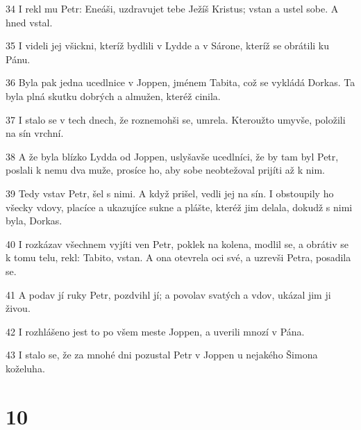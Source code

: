 \par 34 I rekl mu Petr: Eneáši, uzdravujet tebe Ježíš Kristus; vstan a ustel sobe. A hned vstal.
\par 35 I videli jej všickni, kteríž bydlili v Lydde a v Sárone, kteríž se obrátili ku Pánu.
\par 36 Byla pak jedna ucedlnice v Joppen, jménem Tabita, což se vykládá Dorkas. Ta byla plná skutku dobrých a almužen, kteréž cinila.
\par 37 I stalo se v tech dnech, že roznemohši se, umrela. Kteroužto umyvše, položili na sín vrchní.
\par 38 A že byla blízko Lydda od Joppen, uslyšavše ucedlníci, že by tam byl Petr, poslali k nemu dva muže, prosíce ho, aby sobe neobtežoval prijíti až k nim.
\par 39 Tedy vstav Petr, šel s nimi. A když prišel, vedli jej na sín. I obstoupily ho všecky vdovy, placíce a ukazujíce sukne a plášte, kteréž jim delala, dokudž s nimi byla, Dorkas.
\par 40 I rozkázav všechnem vyjíti ven Petr, poklek na kolena, modlil se, a obrátiv se k tomu telu, rekl: Tabito, vstan. A ona otevrela oci své, a uzrevši Petra, posadila se.
\par 41 A podav jí ruky Petr, pozdvihl jí; a povolav svatých a vdov, ukázal jim ji živou.
\par 42 I rozhlášeno jest to po všem meste Joppen, a uverili mnozí v Pána.
\par 43 I stalo se, že za mnohé dni pozustal Petr v Joppen u nejakého Šimona koželuha.

\chapter{10}

